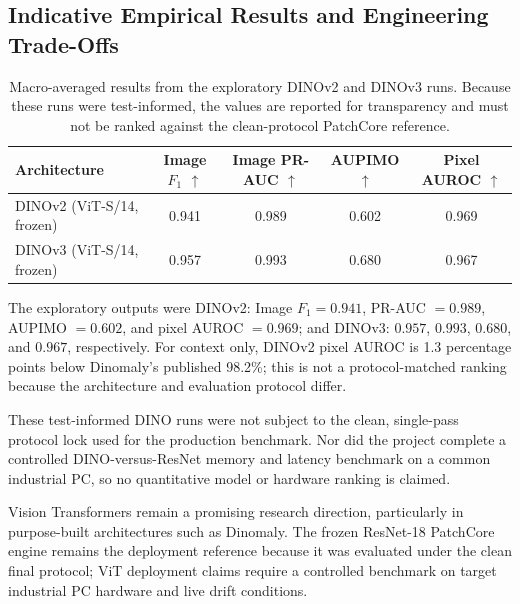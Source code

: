 \subsection{Indicative Empirical Results and Engineering Trade-Offs}

\begin{table}[b!]
\centering
\caption{Macro-averaged results from the exploratory DINOv2 and DINOv3 runs. Because these runs were test-informed, the values are reported for transparency and must not be ranked against the clean-protocol PatchCore reference.}
\label{tab:dino_results}
\scriptsize
\begin{tabular}{@{}lcccc@{}}
\toprule
\textbf{Architecture} & \textbf{Image $F_1$ $\uparrow$} & \textbf{Image PR-AUC $\uparrow$} & \textbf{AUPIMO $\uparrow$} & \textbf{Pixel AUROC $\uparrow$} \\
\midrule
DINOv2 (ViT-S/14, frozen) & 0.941 & 0.989 & 0.602 & 0.969 \\
DINOv3 (ViT-S/14, frozen) & 0.957 & 0.993 & 0.680 & 0.967 \\
\bottomrule
\end{tabular}
\end{table}

The exploratory outputs were DINOv2: Image $F_1=0.941$, PR-AUC $=0.989$, AUPIMO $=0.602$, and pixel AUROC $=0.969$; and DINOv3: $0.957$, $0.993$, $0.680$, and $0.967$, respectively. For context only, DINOv2 pixel AUROC is 1.3 percentage points below Dinomaly's published 98.2\%; this is not a protocol-matched ranking because the architecture and evaluation protocol differ.

These test-informed DINO runs were not subject to the clean, single-pass protocol lock used for the production benchmark. Nor did the project complete a controlled DINO-versus-ResNet memory and latency benchmark on a common industrial PC, so no quantitative model or hardware ranking is claimed.

Vision Transformers remain a promising research direction, particularly in purpose-built architectures such as Dinomaly. The frozen ResNet-18 PatchCore engine remains the deployment reference because it was evaluated under the clean final protocol; ViT deployment claims require a controlled benchmark on target industrial PC hardware and live drift conditions.

